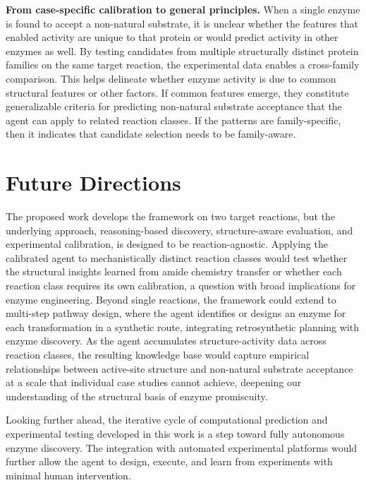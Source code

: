 \documentclass[12pt]{article}
\begin{document}
\textbf{From case-specific calibration to general principles.} When a single enzyme is found to accept a non-natural substrate, it is unclear whether the features that enabled activity are unique to that protein or would predict activity in other enzymes as well. By testing candidates from multiple structurally distinct protein families on the same target reaction, the experimental data enables a cross-family comparison. This helps delineate whether enzyme activity is due to common structural features or other factors. If common features emerge, they constitute generalizable criteria for predicting non-natural substrate acceptance that the agent can apply to related reaction classes. If the patterns are family-specific, then it indicates that candidate selection needs to be family-aware.

\section{Future Directions}
\label{sec:FutureDirections}
The proposed work develops the framework on two target reactions, but the underlying approach, reasoning-based discovery, structure-aware evaluation, and experimental calibration, is designed to be reaction-agnostic. Applying the calibrated agent to mechanistically distinct reaction classes would test whether the structural insights learned from amide chemistry transfer or whether each reaction class requires its own calibration, a question with broad implications for enzyme engineering. Beyond single reactions, the framework could extend to multi-step pathway design, where the agent identifies or designs an enzyme for each transformation in a synthetic route, integrating retrosynthetic planning with enzyme discovery. As the agent accumulates structure-activity data across reaction classes, the resulting knowledge base would capture empirical relationships between active-site structure and non-natural substrate acceptance at a scale that individual case studies cannot achieve, deepening our understanding of the structural basis of enzyme promiscuity.

Looking further ahead, the iterative cycle of computational prediction and experimental testing developed in this work is a step toward fully autonomous enzyme discovery. The integration with automated experimental platforms would further allow the agent to design, execute, and learn from experiments with minimal human intervention. 
\clearpage

\end{document}
